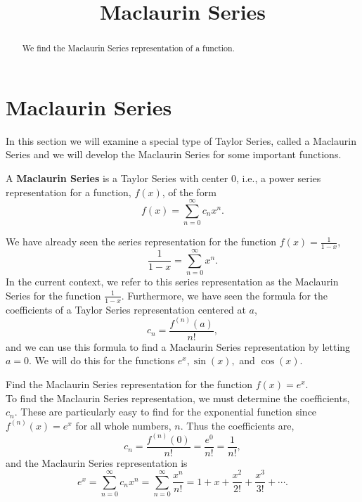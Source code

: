 \documentclass{ximera}
\title{Maclaurin Series}
\begin{document}
\begin{abstract}
We find the Maclaurin Series representation of a function.
\end{abstract}

\maketitle

\section{Maclaurin Series}


In this section we will examine a special type of Taylor Series, called a Maclaurin Series and we will develop the Maclaurin Series for 
some important functions.

\begin{definition} A \textbf{Maclaurin Series} is a Taylor Series with center 0, i.e., a power series representation 
for a function, $f(x)$, of the form
\[
f(x) = \sum_{n=0}^\infty c_n x^n.
\]
\end{definition}
 
We have already seen the series representation for the function $f(x) = \frac{1}{1-x}$,
\[
\frac{1}{1-x} = \sum_{n=0}^\infty  x^n.
\]
In the current context, we refer to this series representation as the Maclaurin Series for the function $\frac{1}{1-x}$.
Furthermore, we have seen the formula for the coefficients of a Taylor Series representation centered at $a$,
\[
c_n = \frac{f^{(n)}(a)}{n!},
\]
and we can use this formula to find a Maclaurin Series representation by letting $a = 0$.
We will do this for the functions $e^x, \sin(x),$ and $\cos(x)$.

\begin{example} Find the Maclaurin Series representation for the function $f(x) = e^x$.\\
To find the Maclaurin Series representation, we must determine the coefficients, $c_n$. These are particularly easy to find for the exponential function
since $f^{(n)}(x) = e^x$ for all whole numbers, $n$. Thus the coefficients are,
\[
c_n = \frac{f^{(n)}(0)}{n!} = \frac{e^0}{n!} = \frac{1}{n!},
\]
and the Maclaurin Series representation is 
\[
e^x = \sum_{n=0}^\infty c_n x^n = \sum_{n=0}^\infty \frac{x^n}{n!} = 1 + x + \frac{x^2}{2!} + \frac{x^3}{3!} + \cdots.
\]
\end{example}
\end{document}
